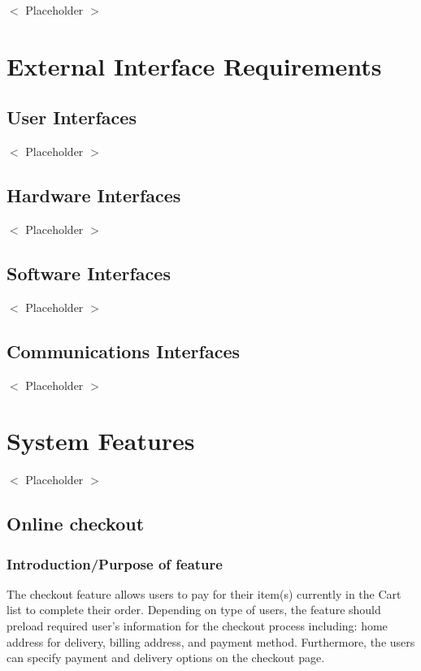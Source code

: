 \documentclass{scrreprt}
\begin{document}
$<$ Placeholder $>$


\chapter{External Interface Requirements}

\section{User Interfaces}
$<$ Placeholder $>$

\section{Hardware Interfaces}
$<$ Placeholder $>$

\section{Software Interfaces}
$<$ Placeholder $>$

\section{Communications Interfaces}
$<$ Placeholder $>$


\chapter{System Features}
$<$ Placeholder $>$


\section{Online checkout}
\subsection{Introduction/Purpose of feature}
The checkout feature allows users to pay for their item(s) currently in the Cart list to complete their order. Depending on type of users, the feature should preload required user’s information for the checkout process including: home address for delivery, billing address, and payment method. Furthermore, the users can specify payment and delivery options on the checkout page. 
\end{document}
